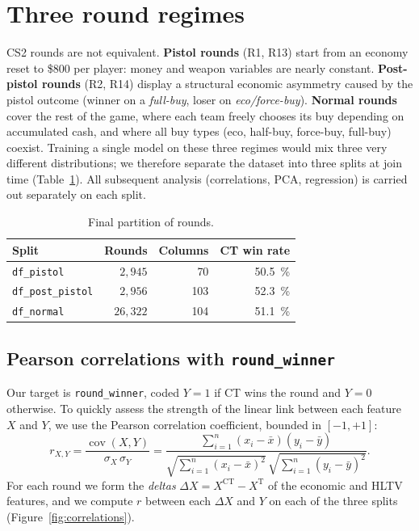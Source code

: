 \section{Three round regimes}
\label{sec:split_pearson}

CS2 rounds are not equivalent. \textbf{Pistol rounds} (R1, R13) start
from an economy reset to \$800 per player: money and weapon variables
are nearly constant. \textbf{Post-pistol rounds} (R2, R14) display a
structural economic asymmetry caused by the pistol outcome (winner on
a \emph{full-buy}, loser on \emph{eco/force-buy}). \textbf{Normal
rounds} cover the rest of the game, where each team freely chooses
its buy depending on accumulated cash, and where all buy types (eco,
half-buy, force-buy, full-buy) coexist. Training a single model on
these three regimes would mix three very different distributions; we
therefore separate the dataset into three splits at join time
(Table~\ref{tab:splits}). All subsequent analysis (correlations, PCA,
regression) is carried out separately on each split.

\begin{table}[H]
\centering
\small
\begin{tabular}{lrrr}
\toprule
\textbf{Split} & \textbf{Rounds} & \textbf{Columns} & \textbf{CT win rate} \\
\midrule
\texttt{df\_pistol}       & $2{,}945$  & 70  & 50.5~\% \\
\texttt{df\_post\_pistol} & $2{,}956$  & 103 & 52.3~\% \\
\texttt{df\_normal}       & $26{,}322$ & 104 & 51.1~\% \\
\bottomrule
\end{tabular}
\caption{Final partition of rounds.}
\label{tab:splits}
\end{table}

\subsection{Pearson correlations with \texttt{round\_winner}}
\label{subsec:pearson}

Our target is \texttt{round\_winner}, coded $Y = 1$ if CT wins the
round and $Y = 0$ otherwise. To quickly assess the strength of the
linear link between each feature $X$ and $Y$, we use the Pearson
correlation coefficient, bounded in $[-1, +1]$:
\[
r_{X,Y} = \frac{\operatorname{cov}(X,Y)}{\sigma_X\,\sigma_Y}
        = \frac{\sum_{i=1}^{n}(x_i-\bar x)(y_i-\bar y)}
               {\sqrt{\sum_{i=1}^{n}(x_i-\bar x)^2}\,\sqrt{\sum_{i=1}^{n}(y_i-\bar y)^2}}.
\]
For each round we form the \emph{deltas}
$\Delta X = X^{\text{CT}} - X^{\text{T}}$ of the economic and HLTV
features, and we compute $r$ between each $\Delta X$ and $Y$ on each
of the three splits (Figure~\ref{fig:correlations}).

